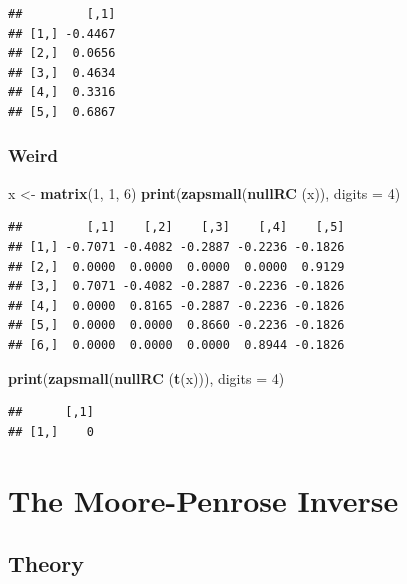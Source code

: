 \documentclass[12pt,]{article}
\newenvironment{Shaded}{\begin{snugshade}}{\end{snugshade}}
\newcommand{\KeywordTok}[1]{\textcolor[rgb]{0.13,0.29,0.53}{\textbf{#1}}}
\newcommand{\DataTypeTok}[1]{\textcolor[rgb]{0.13,0.29,0.53}{#1}}
\newcommand{\DecValTok}[1]{\textcolor[rgb]{0.00,0.00,0.81}{#1}}
\newcommand{\StringTok}[1]{\textcolor[rgb]{0.31,0.60,0.02}{#1}}
\newcommand{\NormalTok}[1]{#1}
\begin{document}
\begin{verbatim}
##         [,1]
## [1,] -0.4467
## [2,]  0.0656
## [3,]  0.4634
## [4,]  0.3316
## [5,]  0.6867
\end{verbatim}

\subsubsection{Weird}\label{weird-2}

\begin{Shaded}
\begin{Highlighting}[]
\NormalTok{x <-}\StringTok{ }\KeywordTok{matrix}\NormalTok{(}\DecValTok{1}\NormalTok{, }\DecValTok{1}\NormalTok{, }\DecValTok{6}\NormalTok{)}
\KeywordTok{print}\NormalTok{(}\KeywordTok{zapsmall}\NormalTok{(}\KeywordTok{nullRC}\NormalTok{ (x)), }\DataTypeTok{digits =} \DecValTok{4}\NormalTok{)}
\end{Highlighting}
\end{Shaded}

\begin{verbatim}
##         [,1]    [,2]    [,3]    [,4]    [,5]
## [1,] -0.7071 -0.4082 -0.2887 -0.2236 -0.1826
## [2,]  0.0000  0.0000  0.0000  0.0000  0.9129
## [3,]  0.7071 -0.4082 -0.2887 -0.2236 -0.1826
## [4,]  0.0000  0.8165 -0.2887 -0.2236 -0.1826
## [5,]  0.0000  0.0000  0.8660 -0.2236 -0.1826
## [6,]  0.0000  0.0000  0.0000  0.8944 -0.1826
\end{verbatim}

\begin{Shaded}
\begin{Highlighting}[]
\KeywordTok{print}\NormalTok{(}\KeywordTok{zapsmall}\NormalTok{(}\KeywordTok{nullRC}\NormalTok{ (}\KeywordTok{t}\NormalTok{(x))), }\DataTypeTok{digits =} \DecValTok{4}\NormalTok{)}
\end{Highlighting}
\end{Shaded}

\begin{verbatim}
##      [,1]
## [1,]    0
\end{verbatim}

\section{The Moore-Penrose Inverse}\label{the-moore-penrose-inverse}

\subsection{Theory}\label{theory-3}
\end{document}
